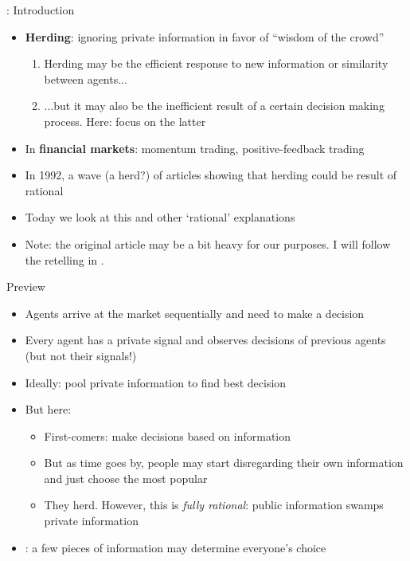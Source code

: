 \documentclass[english,10pt
,aspectratio=169
]{beamer}
\begin{document}
\begin{frame}{\cite{smith_pathological_2000}: Introduction}
	\begin{itemize}
		\item \textbf{Herding}: ignoring private information in favor of ``wisdom of the crowd''
		\begin{enumerate}
			\item Herding may be the efficient response to new information or similarity between agents...
			\item ...but it may also be the inefficient result of a certain decision making process. Here: focus on the latter
		\end{enumerate}
		\item In \textbf{financial markets}: momentum trading, positive-feedback trading
		\item In 1992, a wave (a herd?) of articles showing that  herding could be result of rational 
		\item Today we look at this and other `rational' explanations
		\item Note: the original article may be a bit heavy for our purposes. I will follow the retelling in \cite{smith_observational_2011}.
	\end{itemize}
\end{frame}


\begin{frame}{Preview}
	\begin{itemize}
		\item Agents arrive at the market sequentially and need to make a decision
		\item Every agent has a private signal and observes decisions of previous agents (but not their signals!)
		\item Ideally: pool private information to find best decision
		\item But here: 
		\begin{itemize}
			\item First-comers: make decisions based on information
			\item But as time goes by, people may start disregarding their own information and just choose the most popular
			\item They herd. However, this is \emph{fully rational}: public information swamps private information
		\end{itemize}
		\item {}: a few pieces of information may determine everyone's choice
	\end{itemize}
\end{frame}
\end{document}
